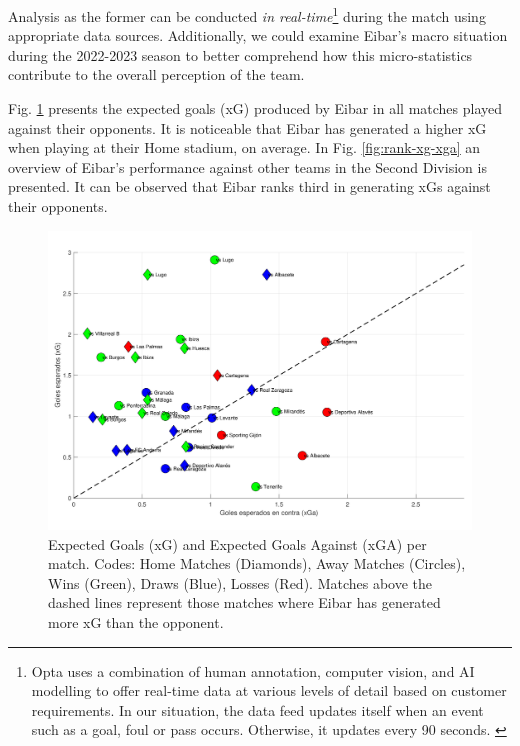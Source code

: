 \documentclass[
  twoside,nohyper]{book}
\begin{document}
Analysis as the former can be conducted \emph{in real-time}\footnote{Opta uses a combination of human annotation, computer vision, and
  AI modelling to offer real-time data at various levels of detail
  based on customer requirements. In our situation, the data feed
  updates itself when an event such as a goal, foul or pass occurs.
  Otherwise, it updates every 90 seconds. \citep{opta}} during the
match using appropriate data sources. Additionally, we could examine
Eibar's macro situation during the 2022-2023 season to better comprehend
how this micro-statistics contribute to the overall perception of the
team.

Fig. \ref{fig:xg-xga} presents the expected goals (xG) produced by Eibar in all matches played against their opponents. It is noticeable that Eibar has generated a higher xG when playing at their Home stadium, on average. In Fig. \ref{fig:rank-xg-xga} an overview of Eibar's performance against other teams in the Second Division is presented. It can be observed that Eibar ranks third in generating xGs against their opponents.

\begin{figure}[H]

{\centering \includegraphics[width=0.8\linewidth,]{imagenes/scat-xG-xGa} 

}

\caption{Expected Goals (xG) and Expected Goals Against (xGA) per match. Codes: Home Matches (Diamonds), Away Matches (Circles), Wins (Green), Draws (Blue), Losses (Red). Matches above the dashed lines represent those matches where Eibar has generated more xG than the opponent.}\label{fig:xg-xga}
\end{figure}
\end{document}
